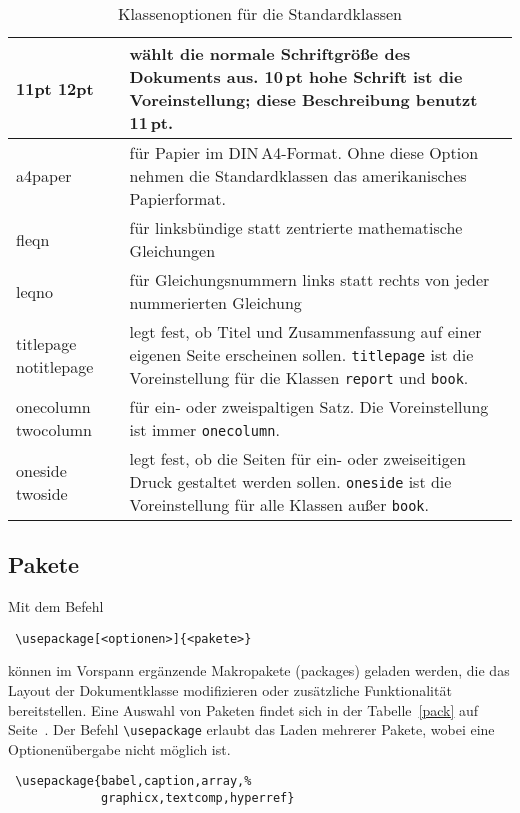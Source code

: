 \begin{table}[hbpt]
\small
\centering
\caption[Klassenoptionen]{Klassenoptionen für die Standardklassen}
\label{options}
\renewcommand\arraystretch{1.5}
\begin{tabularx}{.95\linewidth}%
      {@{}>{\raggedright\arraybackslash\ttfamily}p{2.2cm}X@{}}
\toprule
 10pt 11pt  12pt & 
 wählt die normale Schriftgröße des Dokuments aus. 10\,pt hohe Schrift ist die 
 Voreinstellung; diese Beschreibung benutzt 11\,pt. 
\\\midrule
 a4paper & 
 für Papier im DIN\,A4-Format. Ohne diese Option nehmen die Standardklassen das 
 amerikanisches Papierformat. 
\\\midrule
 fleqn & 
 für linksbündige statt zentrierte mathematische Gleichungen 
\\\midrule
 leqno &
 für Gleichungsnummern links statt rechts von jeder   nummerierten Gleichung 
\\\midrule
 titlepage  notitlepage & 
 legt fest, ob Titel und Zusammenfassung auf einer eigenen Seite erscheinen 
 sollen.  \texttt{titlepage} ist die Voreinstellung für die Klassen 
 \texttt{report} und \texttt{book}. 
\\\midrule
 onecolumn   twocolumn & 
 für ein- oder zweispaltigen Satz.  Die Voreinstellung ist immer 
 \texttt{onecolumn}.  
\\\midrule
 oneside   twoside & 
 legt fest, ob die Seiten für ein- oder zweiseitigen  Druck gestaltet werden 
 sollen. \texttt{oneside} ist die Voreinstellung für alle Klassen außer 
 \texttt{book}.
\\\bottomrule
\end{tabularx}
\end{table}



\subsection{Pakete}\label{packages}
 
Mit dem Befehl
\begin{lstlisting}
 \usepackage[<optionen>]{<pakete>}
\end{lstlisting}
können im Vorspann ergänzende Makropakete (packages) geladen werden, die das 
Layout der Dokumentklasse modifizieren oder zusätzliche Funktionalität 
bereitstellen. Eine Auswahl von Paketen findet sich in der Tabelle~\ref{pack} 
auf Seite~\pageref{pack}. Der Befehl \lstinline+\usepackage+ erlaubt das Laden
mehrerer Pakete, wobei eine Optionenübergabe nicht möglich ist.
\begin{lstlisting}
 \usepackage{babel,caption,array,%
             graphicx,textcomp,hyperref}
\end{lstlisting}

